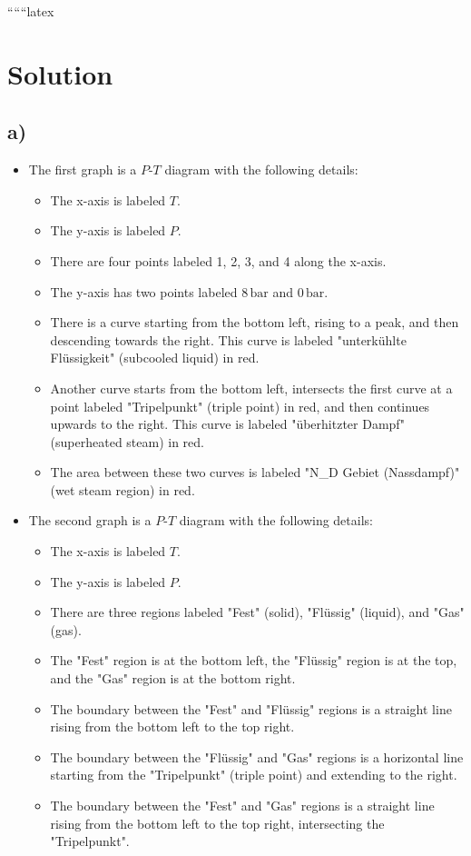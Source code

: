 
``````latex


\section*{Solution}

\subsection*{a)}

\begin{itemize}
    \item The first graph is a $P$-$T$ diagram with the following details:
    \begin{itemize}
        \item The x-axis is labeled $T$.
        \item The y-axis is labeled $P$.
        \item There are four points labeled 1, 2, 3, and 4 along the x-axis.
        \item The y-axis has two points labeled $8 \, \text{bar}$ and $0 \, \text{bar}$.
        \item There is a curve starting from the bottom left, rising to a peak, and then descending towards the right. This curve is labeled "unterkühlte Flüssigkeit" (subcooled liquid) in red.
        \item Another curve starts from the bottom left, intersects the first curve at a point labeled "Tripelpunkt" (triple point) in red, and then continues upwards to the right. This curve is labeled "überhitzter Dampf" (superheated steam) in red.
        \item The area between these two curves is labeled "N\_D Gebiet (Nassdampf)" (wet steam region) in red.
    \end{itemize}
    
    \item The second graph is a $P$-$T$ diagram with the following details:
    \begin{itemize}
        \item The x-axis is labeled $T$.
        \item The y-axis is labeled $P$.
        \item There are three regions labeled "Fest" (solid), "Flüssig" (liquid), and "Gas" (gas).
        \item The "Fest" region is at the bottom left, the "Flüssig" region is at the top, and the "Gas" region is at the bottom right.
        \item The boundary between the "Fest" and "Flüssig" regions is a straight line rising from the bottom left to the top right.
        \item The boundary between the "Flüssig" and "Gas" regions is a horizontal line starting from the "Tripelpunkt" (triple point) and extending to the right.
        \item The boundary between the "Fest" and "Gas" regions is a straight line rising from the bottom left to the top right, intersecting the "Tripelpunkt".
    \end{itemize}
\end{itemize}

